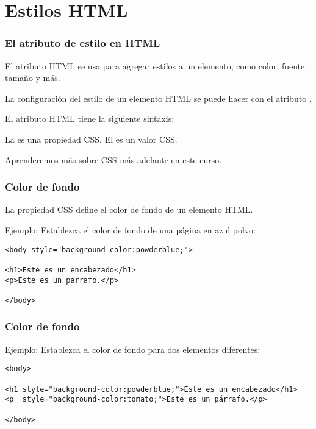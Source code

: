 \section{Estilos HTML}

\begin{frame}[fragile]
  \frametitle{El atributo de estilo en HTML}

  El atributo HTML  se usa para agregar estilos a un
  elemento, como color, fuente, tamaño y más.

  \vspace{\baselineskip}
  La configuración del estilo de un elemento HTML se puede hacer con
  el atributo .

  \vspace{\baselineskip}
  El atributo HTML  tiene la siguiente sintaxis:

  \vspace{\baselineskip}
   \eti{>}

  \vspace{\baselineskip}
  La  es una propiedad CSS.
  El  es un valor CSS.

  \begin{block}{}
    Aprenderemos más sobre CSS más adelante en este curso.
  \end{block}
\end{frame}

\begin{frame}[fragile]
  \frametitle{Color de fondo}

  La propiedad CSS  define el color de
  fondo de un elemento HTML.

  \vspace{\baselineskip}
  Ejemplo: Establezca el color de fondo de una página en azul polvo:
  \begin{lstlisting}
<body style="background-color:powderblue;">

<h1>Este es un encabezado</h1>
<p>Este es un párrafo.</p>

</body> 
  \end{lstlisting}
\end{frame}

\begin{frame}[fragile]
  \frametitle{Color de fondo}

  \vspace{\baselineskip}
  Ejemplo: Establezca el color de fondo para dos elementos diferentes:
  \begin{lstlisting}
<body>

<h1 style="background-color:powderblue;">Este es un encabezado</h1>
<p  style="background-color:tomato;">Este es un párrafo.</p>

</body> 
  \end{lstlisting}
\end{frame}


